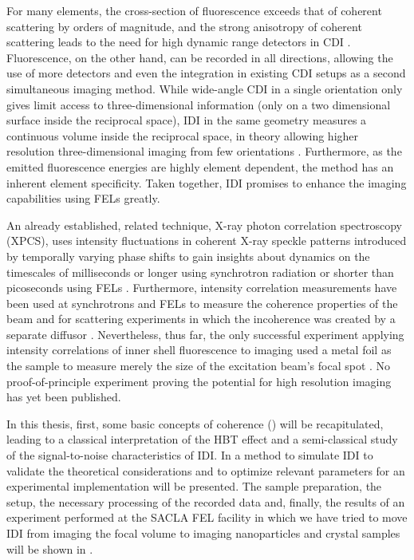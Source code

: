 For many elements, the cross-section of fluorescence exceeds that of coherent scattering by orders of magnitude, and the strong anisotropy of coherent scattering leads to the need for high dynamic range detectors in CDI \cite{xraylib,attwood1999}.  Fluorescence, on the other hand, can be recorded in all directions, allowing the use of more detectors and even the integration in existing CDI setups as a second simultaneous imaging method. While wide-angle CDI in a single orientation only gives limit access to three-dimensional information  (only on a two dimensional surface inside the reciprocal space), IDI in the same geometry measures a continuous volume inside the reciprocal space, in theory allowing higher resolution three-dimensional imaging from few orientations \cite{barke2015,classen2017}. Furthermore, as the emitted fluorescence energies are highly element dependent, the method has an inherent element specificity. Taken together, IDI promises to enhance the imaging capabilities using FELs  greatly.

An already established, related technique, X-ray photon correlation spectroscopy (XPCS), uses intensity fluctuations in coherent X-ray speckle patterns introduced by temporally varying phase shifts to gain insights about dynamics on the timescales of milliseconds or longer using synchrotron radiation or shorter than picoseconds using FELs \cite{lehmkuhler2021,grubel2007}. Furthermore, intensity correlation measurements have been used at synchrotrons and FELs to measure the coherence properties of the beam and for scattering experiments in which the incoherence was created by a separate diffusor \cite{yabashi2002,singer2013,inoue2019,gorobtsov2018,schneider2018}.  Nevertheless, thus far, the only successful experiment applying intensity correlations of inner shell fluorescence to imaging used a metal foil as the sample to measure merely the size of the excitation beam's focal spot \cite{nakumura2020}. No proof-of-principle experiment proving the potential for high resolution imaging has yet been published. 

In this thesis, first, some basic concepts of coherence () will be recapitulated, leading to a classical interpretation of the HBT effect and a semi-classical study of the signal-to-noise characteristics of IDI. In  a method to simulate IDI to validate the theoretical considerations and to optimize relevant parameters for an experimental implementation will be presented. The sample preparation, the setup, the necessary processing of the recorded data and, finally, the results of an experiment performed at the SACLA FEL facility in which we have tried to move IDI from imaging the focal volume to imaging nanoparticles and crystal samples will be shown in .

\cleardoublepage
